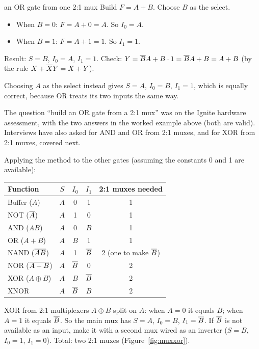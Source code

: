 \begin{worked}{an OR gate from one 2:1 mux}
Build $F = A + B$. Choose $B$ as the select.
\begin{itemize}
  \item When $B = 0$: $F = A + 0 = A$. So $I_0 = A$.
  \item When $B = 1$: $F = A + 1 = 1$. So $I_1 = 1$.
\end{itemize}
Result: $S = B$, $I_0 = A$, $I_1 = 1$. Check: $Y = \overline{B}A + B\cdot1 = \overline{B}A + B = A + B$ (by the rule $X + \overline{X}Y = X + Y$).

Choosing $A$ as the select instead gives $S = A$, $I_0 = B$, $I_1 = 1$, which is equally correct, because OR treats its two inputs the same way.
\end{worked}

\begin{onoa}
The question ``build an OR gate from a 2:1 mux'' was on the Ignite hardware assessment, with the two answers in the worked example above (both are valid). Interviews have also asked for AND and OR from 2:1 muxes, and for XOR from 2:1 muxes, covered next.
\end{onoa}

Applying the method to the other gates (assuming the constants 0 and 1 are available):

\begin{center}
\begin{tabular}{lcccc}
\toprule
Function & $S$ & $I_0$ & $I_1$ & 2:1 muxes needed \\
\midrule
Buffer ($A$) & $A$ & 0 & 1 & 1 \\
NOT ($\overline{A}$) & $A$ & 1 & 0 & 1 \\
AND ($AB$) & $A$ & 0 & $B$ & 1 \\
OR ($A + B$) & $A$ & $B$ & 1 & 1 \\
NAND ($\overline{AB}$) & $A$ & 1 & $\overline{B}$ & 2 (one to make $\overline{B}$) \\
NOR ($\overline{A+B}$) & $A$ & $\overline{B}$ & 0 & 2 \\
XOR ($A \oplus B$) & $A$ & $B$ & $\overline{B}$ & 2 \\
XNOR & $A$ & $\overline{B}$ & $B$ & 2 \\
\bottomrule
\end{tabular}
\end{center}

\begin{worked}{XOR from 2:1 multiplexers}
$A \oplus B$ split on $A$: when $A = 0$ it equals $B$; when $A = 1$ it equals $\overline{B}$. So the main mux has $S = A$, $I_0 = B$, $I_1 = \overline{B}$. If $\overline{B}$ is not available as an input, make it with a second mux wired as an inverter ($S = B$, $I_0 = 1$, $I_1 = 0$). Total: two 2:1 muxes (Figure~\ref{fig:muxxor}).
\end{worked}

